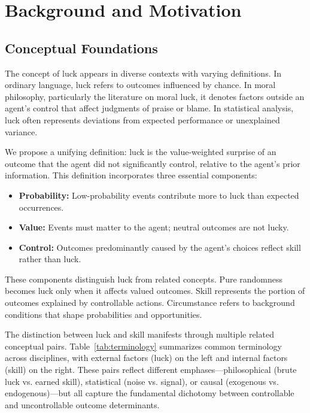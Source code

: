   \section{Background and Motivation}
  \label{sec:background}

  \subsection{Conceptual Foundations}

  The concept of luck appears in diverse contexts with varying definitions.
  In ordinary language, luck refers to outcomes influenced by chance. In
  moral philosophy, particularly the literature on moral luck, it
  denotes factors outside an agent's control that affect judgments of
  praise or blame. In statistical analysis, luck often represents
  deviations from expected performance or unexplained variance.

  We propose a unifying definition: luck is the value-weighted surprise of
  an outcome that the agent did not significantly control, relative to
  the agent's prior information. This definition incorporates three essential
  components:

  \begin{itemize}
    \item \textbf{Probability:} Low-probability events contribute more
      to luck than expected occurrences.

    \item \textbf{Value:} Events must matter to the agent; neutral outcomes
      are not lucky.

    \item \textbf{Control:} Outcomes predominantly caused by the agent's
      choices reflect skill rather than luck.
  \end{itemize}

  These components distinguish luck from related concepts. Pure randomness
  becomes luck only when it affects valued outcomes. Skill represents
  the portion of outcomes explained by controllable actions. Circumstance
  refers to background conditions that shape probabilities and opportunities.

  The distinction between luck and skill manifests through multiple
  related conceptual pairs. Table~\ref{tab:terminology} summarizes
  common terminology across disciplines, with external factors (luck)
  on the left and internal factors (skill) on the right. These pairs
  reflect different emphases—philosophical (brute luck vs. earned skill),
  statistical (noise vs. signal), or causal (exogenous vs. endogenous)—but
  all capture the fundamental dichotomy between controllable and
  uncontrollable outcome determinants.

